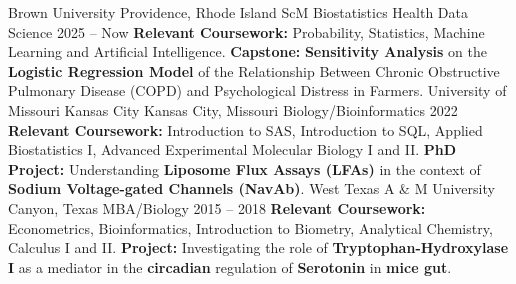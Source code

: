 \documentclass[9pt]{adeckcv} %
\begin{document}



  

\begin{entrylist}
\entry
{\large{Brown University}} 
{Providence, Rhode Island}
{ScM Biostatistics Health Data Science}
{2025 -- Now}
{\itemizeeducation
  {\textbf{Relevant Coursework:} Probability, Statistics, Machine Learning and Artificial Intelligence.}
  {\textbf{Capstone:} \textbf{Sensitivity Analysis} on the \textbf{Logistic Regression Model} of the Relationship Between Chronic Obstructive Pulmonary Disease (COPD) and Psychological Distress in Farmers.}
}
\entry
{\large{University of Missouri Kansas City}} 
{Kansas City, Missouri}
{Biology/Bioinformatics}
{2022}
{\itemizeeducation
  {\textbf{Relevant Coursework:} Introduction to SAS, Introduction to SQL, Applied Biostatistics I, Advanced Experimental Molecular Biology I and II.}
  {\textbf{PhD Project:} Understanding \textbf{Liposome Flux Assays (LFAs)} in the context of \textbf{Sodium Voltage-gated Channels (NavAb)}.}
}
\entry
{\large{West Texas A \& M University}} 
{Canyon, Texas}
{MBA/Biology}
{2015 -- 2018}
{\itemizeeducation
  {\textbf{Relevant Coursework:} Econometrics, Bioinformatics, Introduction to Biometry, Analytical Chemistry, Calculus I and II.}
  {\textbf{Project:} Investigating the role of \textbf{Tryptophan-Hydroxylase I} as a mediator in the \textbf{circadian} regulation of \textbf{Serotonin} in \textbf{mice gut}.}
}
\end{entrylist}

  
\end{document}

